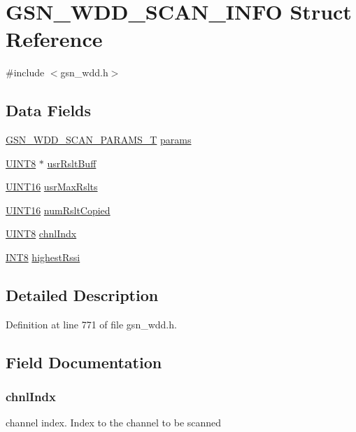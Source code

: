 \hypertarget{a00285}{
\section{GSN\_\-WDD\_\-SCAN\_\-INFO Struct Reference}
\label{a00285}
}


{\ttfamily \#include $<$gsn\_\-wdd.h$>$}

\subsection*{Data Fields}
\begin{DoxyCompactItemize}
\item 
\hyperlink{a00286}{GSN\_\-WDD\_\-SCAN\_\-PARAMS\_\-T} \hyperlink{a00285_a3c0efac3a2550ab707a57c7d726ad51c}{params}
\item 
\hyperlink{a00660_gab27e9918b538ce9d8ca692479b375b6a}{UINT8} $\ast$ \hyperlink{a00285_aee18f25ad38139fd4e5bfdb4b63640f2}{usrRsltBuff}
\item 
\hyperlink{a00660_ga09f1a1fb2293e33483cc8d44aefb1eb1}{UINT16} \hyperlink{a00285_a936453de45ac760367aa353fe0302dfa}{usrMaxRslts}
\item 
\hyperlink{a00660_ga09f1a1fb2293e33483cc8d44aefb1eb1}{UINT16} \hyperlink{a00285_a44f66633bd87382694e27ab600f55cc7}{numRsltCopied}
\item 
\hyperlink{a00660_gab27e9918b538ce9d8ca692479b375b6a}{UINT8} \hyperlink{a00285_a3ff94bef2c012a49993c3bdd94359710}{chnlIndx}
\item 
\hyperlink{a00660_ga307b8734c020247f6bac4fcde0dcfbb9}{INT8} \hyperlink{a00285_aa95268660e3c7ea1fe1db793de8f7c65}{highestRssi}
\end{DoxyCompactItemize}


\subsection{Detailed Description}


Definition at line 771 of file gsn\_\-wdd.h.



\subsection{Field Documentation}
\hypertarget{a00285_a3ff94bef2c012a49993c3bdd94359710}{
\subsubsection[{chnlIndx}]{ {\bf chnlIndx}}}
\label{a00285_a3ff94bef2c012a49993c3bdd94359710}
channel index. Index to the channel to be scanned 

